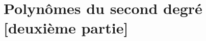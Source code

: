 \documentclass[french]{book}
\newcommand{\R}{\mathbb {R}}
\newcommand{\poly}[1][a]{#1_0+#1_1x+\cdots+#1_nx^n}
\begin{document}
\tableofcontents
\setcounter{chapter}{3}
\chapter{Polynômes du second degré [deuxième partie]}
%
%
%
%
\end{document}
